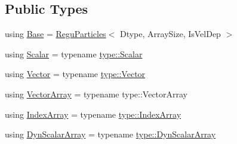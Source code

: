 \subsection*{Public Types}
\begin{DoxyCompactItemize}
\item 
using \mbox{\hyperlink{class_vel_indep_chain_particles_a4db664b33c58724109eb23bc24dd893c}{Base}} = \mbox{\hyperlink{class_regu_particles}{Regu\+Particles}}$<$ Dtype, Array\+Size, Is\+Vel\+Dep $>$
\item 
using \mbox{\hyperlink{class_vel_indep_chain_particles_a0a945beff437274ce5ae8f7d182da8fe}{Scalar}} = typename \mbox{\hyperlink{struct_space_h_1_1_proto_type_af3c8245d83d9db64749882920de5c274}{type\+::\+Scalar}}
\item 
using \mbox{\hyperlink{class_vel_indep_chain_particles_aad309dbb10b07c76d1453f0f659cbde2}{Vector}} = typename \mbox{\hyperlink{struct_space_h_1_1_proto_type_a316b81f4660b2b4fab14a8e1f23b6089}{type\+::\+Vector}}
\item 
using \mbox{\hyperlink{class_vel_indep_chain_particles_a5558cddeaa7eab94920bdfbeffaa432b}{Vector\+Array}} = typename type\+::\+Vector\+Array
\item 
using \mbox{\hyperlink{class_vel_indep_chain_particles_a691749351fb710d16619ef6cc43bb1e6}{Index\+Array}} = typename \mbox{\hyperlink{struct_space_h_1_1_proto_type_a276a37c81faf08681b57e8082f3f6c1b}{type\+::\+Index\+Array}}
\item 
using \mbox{\hyperlink{class_vel_indep_chain_particles_a904d5f59968e5fa9d900b9931cf5aa36}{Dyn\+Scalar\+Array}} = typename \mbox{\hyperlink{struct_space_h_1_1_proto_type_a8f3813f576517856e0ed74af9e5ffcb4}{type\+::\+Dyn\+Scalar\+Array}}
\end{DoxyCompactItemize}
